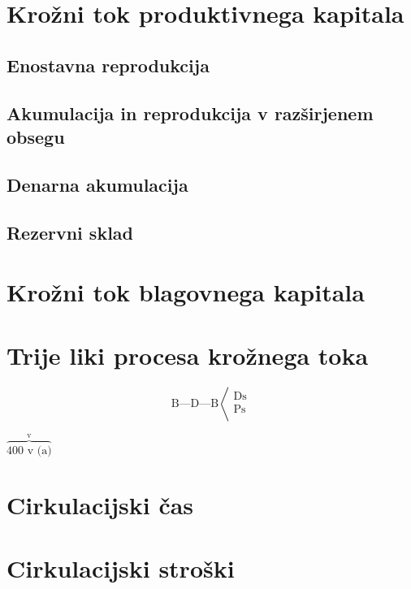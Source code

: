 \documentclass[a5paper]{scrbook}
\begin{document}
\chapter{Krožni tok produktivnega kapitala}

\section{Enostavna reprodukcija}

\section{Akumulacija in reprodukcija v razširjenem obsegu}

\section{Denarna akumulacija}

\section{Rezervni sklad}

\chapter{Krožni tok blagovnega kapitala}

\chapter{Trije liki procesa krožnega toka}

\[
\textrm{B---D---B}
\left\langle
\begin{array}{l}
    \textrm{Ds}\\
    \textrm{Ps}\\
\end{array}
\right.
\]



\( 
\overbrace{\textrm{400 v (a)}}^{\textrm{v}}    
\)

\chapter{Cirkulacijski čas}

\chapter{Cirkulacijski stroški}
\end{document}
